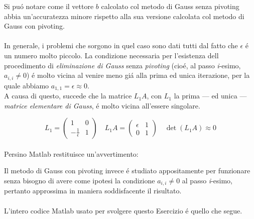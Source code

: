 \noindent Si pu\'o notare come il vettore \(b\) calcolato col metodo di Gauss senza pivoting abbia un'accuratezza minore rispetto alla sua versione calcolata col metodo di Gauss con pivoting.
\\
\\In generale, i problemi che sorgono in quel caso sono dati tutti dal fatto che \(\epsilon \) \'e un numero molto piccolo. La condizione necessaria per l'esistenza dell procedimento di \textit{eliminazione di Gauss} senza \textit{pivoting} (cio\'e, al passo \textit{i}-esimo, \(a_{i,i} \neq 0\)) \'e molto vicina al venire meno gi\'a alla prima ed unica iterazione, per la quale abbiamo \(a_{1,1} = \epsilon \approx 0\).
\\

\noindent A causa di questo, succede che la matrice \(L_1A\), con \(L_1\) la prima --- ed unica --- \textit{matrice elementare di Gauss}, \'e molto vicina all'essere singolare.

\[
L_1 = \begin{pmatrix} 1 & 0 \\ -\frac{1}{\epsilon} & 1 \end{pmatrix} \quad L_1A = \begin{pmatrix} \epsilon & 1 \\ 0 & 1\end{pmatrix} \quad \det(L_1A) \approx 0
\]
\\
Persino Matlab restituisce un'avvertimento:


\noindent Il metodo di Gauss con pivoting invece \'e studiato appositamente per funzionare senza bisogno di avere come ipotesi la condizione \(a_{i,i} \neq 0\) al passo \textit{i}-esimo, pertanto approssima in maniera soddisfacente il risultato.
\\
\\
\noindent L'intero codice Matlab usato per svolgere questo Esercizio \'e quello che segue.



